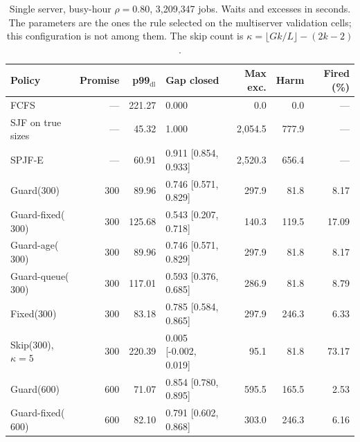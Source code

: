 \documentclass[mathematics,supfile,submit,moreauthors]{Definitions/mdpi}
\newcommand{\devnum}[1]{#1}
\begin{document}
\begin{table}[H]
\centering
\caption{Single server, busy-hour $\rho = \devnum{0.80}$, \devnum{3{,}209{,}347} jobs. Waits and
excesses in seconds. The parameters are the ones the rule selected on the multiserver
validation cells; this configuration is not among them. The skip count is
$\kappa = \lfloor Gk/L \rfloor - (2k-2)$.}
\label{tab:s_k1}
\small
\setlength{\tabcolsep}{3pt}
\begin{tabular}{lrrlrrr}
\toprule
Policy & Promise & p99$_{\mathrm{dl}}$ & Gap closed & Max exc. & Harm & Fired (\%) \\
\midrule
FCFS                         & ---           & \devnum{221.27} & \devnum{0.000} & \devnum{0.0} & \devnum{0.0} & --- \\
SJF on true sizes            & ---           & \devnum{45.32} & \devnum{1.000} & \devnum{2{,}054.5} & \devnum{777.9} & --- \\
SPJF-E                       & ---           & \devnum{60.91} & \devnum{0.911 [0.854, 0.933]} & \devnum{2{,}520.3} & \devnum{656.4} & --- \\
Guard($\devnum{300}$)        & \devnum{300} & \devnum{89.96} & \devnum{0.746 [0.571, 0.829]} & \devnum{297.9} & \devnum{81.8} & \devnum{8.17} \\
Guard-fixed($\devnum{300}$)  & \devnum{300} & \devnum{125.68} & \devnum{0.543 [0.207, 0.718]} & \devnum{140.3} & \devnum{119.5} & \devnum{17.09} \\
Guard-age($\devnum{300}$)    & \devnum{300} & \devnum{89.96} & \devnum{0.746 [0.571, 0.829]} & \devnum{297.9} & \devnum{81.8} & \devnum{8.17} \\
Guard-queue($\devnum{300}$)  & \devnum{300} & \devnum{117.01} & \devnum{0.593 [0.376, 0.685]} & \devnum{286.9} & \devnum{81.8} & \devnum{8.79} \\
Fixed($\devnum{300}$)        & \devnum{300} & \devnum{83.18} & \devnum{0.785 [0.584, 0.865]} & \devnum{297.9} & \devnum{246.3} & \devnum{6.33} \\
Skip($\devnum{300}$), $\kappa=5$  & \devnum{300} & \devnum{220.39} & \devnum{0.005 [-0.002, 0.019]} & \devnum{95.1} & \devnum{81.8} & \devnum{73.17} \\
Guard($\devnum{600}$)        & \devnum{600} & \devnum{71.07} & \devnum{0.854 [0.780, 0.895]} & \devnum{595.5} & \devnum{165.5} & \devnum{2.53} \\
Guard-fixed($\devnum{600}$)  & \devnum{600} & \devnum{82.10} & \devnum{0.791 [0.602, 0.868]} & \devnum{303.0} & \devnum{246.3} & \devnum{6.16} \\

\end{tabular}
\end{table}
\end{document}

